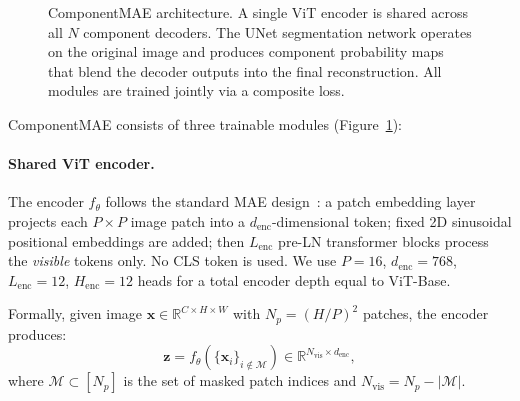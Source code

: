 \documentclass{article}
\newcommand{\RR}{\mathbb{R}}
\newcommand{\bx}{\mathbf{x}}
\begin{document}
\begin{figure}[t]
  \centering
  \caption{ComponentMAE architecture.  A single ViT encoder is shared across all
  $N$ component decoders.  The UNet segmentation network operates on the original
  image and produces component probability maps that blend the decoder outputs into
  the final reconstruction.  All modules are trained jointly via a composite loss.}
  \label{fig:arch}
\end{figure}

ComponentMAE consists of three trainable modules (Figure~\ref{fig:arch}):

\paragraph{Shared ViT encoder.}
The encoder $f_\theta$ follows the standard MAE design~\cite{he2022masked}: a
patch embedding layer projects each $P \times P$ image patch into a
$d_\mathrm{enc}$-dimensional token; fixed 2D sinusoidal positional embeddings
are added; then $L_\mathrm{enc}$ pre-LN transformer blocks process the
\emph{visible} tokens only.  No CLS token is used.  We use
$P\!=\!16$, $d_\mathrm{enc}\!=\!768$, $L_\mathrm{enc}\!=\!12$, $H_\mathrm{enc}\!=\!12$ heads
for a total encoder depth equal to ViT-Base.

Formally, given image $\bx \in \RR^{C \times H \times W}$ with $N_p = (H/P)^2$
patches, the encoder produces:
\begin{equation}
  \mathbf{z} = f_\theta\!\left(\{\bx_i\}_{i \notin \mathcal{M}}\right)
  \in \RR^{N_\mathrm{vis} \times d_\mathrm{enc}},
\end{equation}
where $\mathcal{M} \subset [N_p]$ is the set of masked patch indices and
$N_\mathrm{vis} = N_p - |\mathcal{M}|$.
\end{document}
